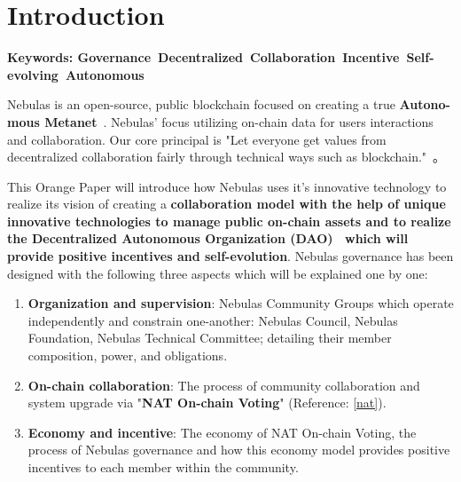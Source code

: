 
\section{Introduction}

\textbf{Keywords: Governance\ Decentralized\ Collaboration\ Incentive\ Self-evolving\ Autonomous }

\vspace{2em}

Nebulas is an open-source, public blockchain focused on creating a true
\textbf{Autono-mous Metanet}~\cite{AutonomousMetanet}. Nebulas' focus utilizing on-chain data for users interactions and collaboration. Our core principal is "Let everyone get values from decentralized collaboration fairly through technical ways such as blockchain."~\cite{vision}。

This Orange Paper will introduce how Nebulas uses it's innovative technology to realize its vision of creating a \textbf{collaboration model with the help of unique innovative technologies to manage public on-chain assets and to realize the Decentralized Autonomous Organization (DAO)~\cite{DAO} which will provide positive incentives and self-evolution}. Nebulas governance has been designed with the following three aspects which will be explained one by one:

\begin{enumerate}
	\item \textbf{Organization and supervision}:
	Nebulas Community Groups which operate independently and constrain one-another: Nebulas Council, Nebulas Foundation, Nebulas Technical Committee; detailing their member composition, power, and obligations.
	\item \textbf{On-chain collaboration}:
	The process of community collaboration and system upgrade via "\textbf{NAT On-chain Voting}" (Reference: \ref{nat}).
	\item \textbf{Economy and incentive}:
	The economy of NAT On-chain Voting, the process of Nebulas governance and how this economy model provides positive incentives to each member within the community.
\end{enumerate}
